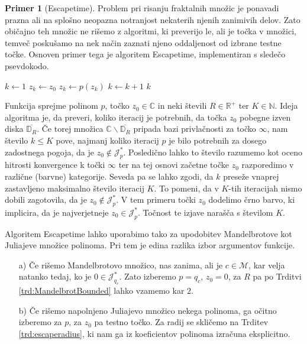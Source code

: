 \documentclass[12pt,a4paper]{amsart}
\theoremstyle{definition} %
\newtheorem{primer}[definicija]{Primer}
\theoremstyle{plain} %
\newcommand{\R}{\mathbb R}
\newcommand{\N}{\mathbb N}
\newcommand{\CC}{\mathbb C}
\newcommand{\D}{\mathbb D} %
\newcommand{\M}{\mathscr M} %
\newcommand{\J}{\mathscr J} %
\newcommand{\algAnd}{\;\textbf{and}\;}
\begin{document}
\begin{primer}[Escapetime]\label{pr:Escapetime}
Problem pri risanju fraktalnih množic je ponavadi prazna ali na splošno neopazna notranjost nekaterih njenih zanimivih delov.
Zato običajno teh množic ne rišemo z algoritmi, ki preverijo le, ali je točka v množici, 
temveč poskušamo na nek način zaznati njeno oddaljenost od izbrane testne točke.
Osnoven primer tega je algoritem Escapetime, implementiran s sledečo psevdokodo.
\begin{small}
\begin{algorithmic}
	\State $k \gets 1$
	\State $z_k \gets z_0$
	\While {$k \leq K \algAnd |z_k| \leq R$}
		\State $z_k \gets p(z_k)$
		\State $k \gets k + 1$
	\EndWhile
	\State \Return $k$
\EndFunction
\end{algorithmic}
\end{small}
Funkcija sprejme polinom $p$, točko $z_0 \in \CC$ in neki števili $R \in \R^+$ ter $K \in \N$.
Ideja algoritma je, da preveri, koliko iteracij je potrebnih, da točka $z_0$ pobegne izven diska $\overline{\D_R}$.
Če torej množica $\CC \smallsetminus \overline{\D_R}$ pripada bazi privlačnosti za točko $\infty$,
nam število $k\leq K$ pove, najmanj koliko iteracij $p$ je bilo potrebnih za dosego zadostnega pogoja, da je $z_0 \notin \J_p^\ast$.
Posledično lahko to število razumemo kot oceno hitrosti konvergence k točki $\infty$
ter na tej osnovi začetne točke $z_0$ razporedimo v različne (barvne) kategorije. 
Seveda pa se lahko zgodi, da $k$ preseže vnaprej zastavljeno maksimalno število iteracij $K$. 
To pomeni, da v $K$-tih iteracijah nismo dobili zagotovila, da je $z_0 \notin \J_p^\ast$.
V tem primeru točki $z_0$ dodelimo črno barvo, ki implicira, da je najverjetneje $z_0 \in \J_p^\ast$.
Točnost te izjave narašča s številom $K$.

Algoritem Escapetime lahko uporabimo tako za upodobitev Mandelbrotove kot Juliajeve množice polinoma.
Pri tem je edina razlika izbor argumentov funkcije.

\begin{enumerate}
\item[a)] Če rišemo Mandelbrotovo množico, nas zanima, ali je $c \in \M$, kar velja natanko tedaj, ko je $0 \in \J_{q_c}^\ast$.
Zato izberemo $p = q_c$, $z_0 = 0$, za $R$ pa po Trditvi \ref{trd:MandelbrotBounded} lahko vzamemo kar $2$.
\item[b)] Če rišemo napolnjeno Juliajevo množico nekega polinoma, ga očitno izberemo za $p$, za $z_0$ pa testno točko.
Za radij se skličemo na Trditev \ref{trd:escaperadius}, ki nam ga iz koeficientov polinoma izračuna eksplicitno.
\end{enumerate}


\end{primer}
\end{document}
